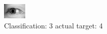 \begin{figure}[h!]
\begin{center}
\includegraphics[width=0.60\columnwidth]{figures/ID3207_class_3_target_4.png}
\end{center}
\caption{ Classification: 3 actual target: 4}
\label{fig:ID3207_class_3_target_4}
\end{figure}
